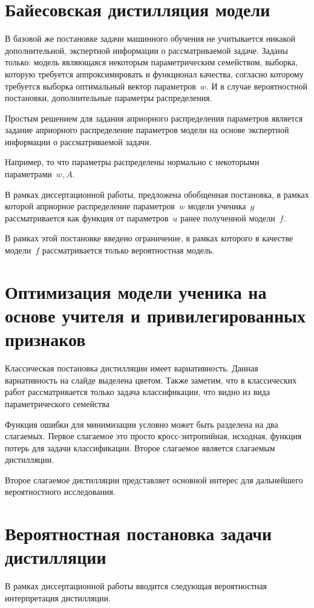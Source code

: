 \documentclass[10pt, twoside]{article}
\begin{document}
\section{Байесовская дистилляция модели}
В базовой же постановке задачи машинного обучения не учитывается никакой дополнительной, экспертной информации о рассматриваемой задаче. Заданы только: модель являющаяся некоторым параметрическим семейством, выборка, которую требуется аппроксимировать и функционал качества, согласно которому требуется выборка оптимальный вектор параметров~$w.$ И в случае вероятностной постановки, дополнительные параметры распределения.

Простым решением для задания априорного распределения параметров является задание априорного распределение параметров модели на основе экспертной информации о рассматриваемой задачи.

Например, то что параметры распределены нормально с некоторыми параметрами~$w, A$.

В рамках диссертационной работы, предложена обобщенная постановка, в рамках которой априорное распределение параметров~$w$ модели ученика~$g$ рассматривается как функция от параметров~$u$ ранее полученной модели~$f$.

В рамках этой постановке введено ограничение, в рамках которого в качестве модели~$f$ рассматривается только вероятностная модель.

\section{Оптимизация модели ученика на основе учителя и привилегированных признаков}
Классическая постановка дистилляции имеет вариативность. Данная вариативность на слайде выделена цветом. Также заметим, что в классических работ рассматривается только задача классификации, что видно из вида параметрического семейства

Функция ошибки для минимизации условно может быть разделена на два слагаемых. Первое слагаемое это просто кросс-энтропийная, исходная, функция потерь для задачи классификации. Второе слагаемое является слагаемым дистилляции.

Второе слагаемое дистилляции представляет основной интерес для дальнейшего вероятностного исследования.

\section{Вероятностная постановка задачи дистилляции}
В рамках диссертационной работы вводится следующая вероятностная интерпретация дистилляции.
\end{document}
